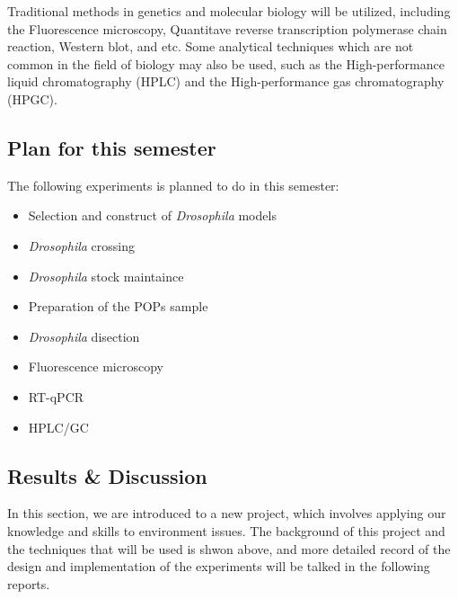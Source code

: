 Traditional methods in genetics and molecular biology will be utilized, including the Fluorescence microscopy,
Quantitave reverse transcription polymerase chain reaction,
Western blot, and etc.
Some analytical techniques which are not common in the field of biology may also be used, 
such as the High-performance liquid chromatography (HPLC) and the High-performance gas chromatography (HPGC).

\subsection{Plan for this semester}
The following experiments is planned to do in this semester:
\begin{itemize}
    \item Selection and construct of \textit{Drosophila} models
    \item \textit{Drosophila} crossing
    \item \textit{Drosophila} stock maintaince
    \item Preparation of the POPs sample
    \item \textit{Drosophila} disection
    \item Fluorescence microscopy
    \item RT-qPCR
    \item HPLC/GC
\end{itemize}

\subsection{Results \& Discussion}

In this section, we are introduced to a new project, which involves applying our knowledge and skills to environment issues. The background of this project and the techniques that will be used is shwon above, and more detailed record of the design and implementation of the experiments will be talked in the following reports.